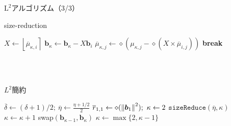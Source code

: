 \documentclass[12pt,aspectratio=169,table,dvipdfmx, leqno]{beamer}
\newcommand{\round}[1]{\left\lfloor #1 \right\rceil}
\begin{document}
\begin{frame}{$\text{L}^2$アルゴリズム（3/3）}
\begin{minipage}[b]{0.45\columnwidth}
\begin{algorithm}[H]
    \footnotesize
    \begin{algorithmic}[1]
        \caption{\footnotesize size-reduction\cite{Stehle10}}
        \label{alg_L2_2}
            \Loop
                        \State $X\gets \round{\overline{\mu}_{\kappa, i}}$
                        \State $\bm{b}_\kappa\gets\bm{b}_\kappa-X\bm{b}_i$
                            \State $\overline{\mu}_{\kappa, j}\gets\diamond(\mu_{\kappa, j}-\diamond(X\times \overline{\mu}_{i, j}))$
                        \EndFor
                    \EndFor
                \Else
                    \State \textbf{break}
                \EndIf
            \EndLoop
    \end{algorithmic}
\end{algorithm}
\mbox{}\\
\mbox{}\\
\end{minipage}
\hspace{0.03\columnwidth} %
\begin{minipage}[b]{0.45\columnwidth}
\begin{algorithm}[H]
    \footnotesize
    \begin{algorithmic}[1]
        \caption{\footnotesize $L^2$簡約\cite{Stehle10}}
        \label{alg_L2_2}
        \State $\overline{\delta}\gets(\delta+1)/2;~\overline{\eta}\gets\frac{\eta+1/2}{2}$
        \State $\overline{r}_{1,1}\gets\diamond(\norm{\bm{b}_1}^2);~\kappa\gets 2$
            \State $\texttt{sizeReduce}(\overline{\eta}, \kappa)$
                \State $\kappa\gets\kappa+1$
            \Else
                \State swap$(\bm{b}_{\kappa-1}, \bm{b}_\kappa)$
                \State $\kappa\gets \max\{2, \kappa-1\}$
            \EndIf
        \EndWhile
    \end{algorithmic}
\end{algorithm}
    \mbox{}\\
\end{minipage}
\end{frame}
\end{document}
